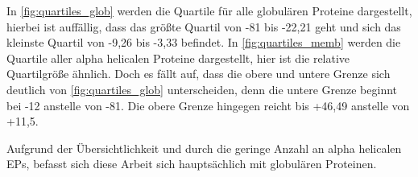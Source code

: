 
In \ref{fig:quartiles_glob} werden die Quartile für alle globulären Proteine dargestellt, hierbei ist auffällig, dass das größte Quartil von -81 bis -22,21 geht und sich das kleinste Quartil von -9,26 bis -3,33 befindet. In \ref{fig:quartiles_memb} werden die Quartile aller alpha helicalen Proteine dargestellt, hier ist die relative Quartilgröße ähnlich. Doch es fällt auf, dass die obere und untere Grenze sich deutlich von \ref{fig:quartiles_glob} unterscheiden, denn die untere Grenze beginnt bei -12 anstelle von -81. Die obere Grenze hingegen reicht bis +46,49 anstelle von +11,5.

Aufgrund der Übersichtlichkeit und durch die geringe Anzahl an alpha helicalen \ac{EPs}, befasst sich diese Arbeit sich hauptsächlich mit globulären Proteinen.


